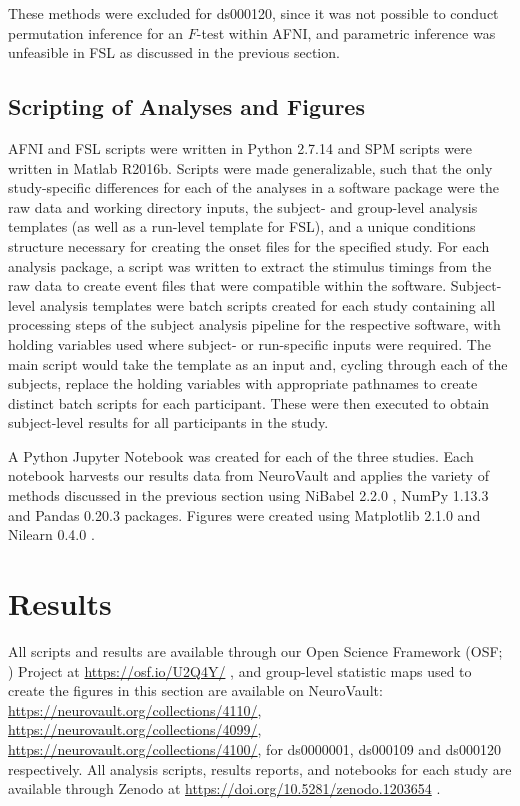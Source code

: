 These methods were excluded for ds000120, since it was not possible to conduct permutation inference for an $F$-test within AFNI, and parametric inference was unfeasible in FSL as discussed in the previous section. 

\subsection{Scripting of Analyses and Figures}
AFNI and FSL scripts were written in Python 2.7.14 and SPM scripts were written in Matlab R2016b. Scripts were made generalizable, such that the only study-specific differences for each of the analyses in a software package were the raw data and working directory inputs, the subject- and group-level analysis templates (as well as a run-level template for FSL), and a unique conditions structure necessary for creating the onset files for the specified study. For each analysis package, a script was written to extract the stimulus timings from the raw data to create event files that were compatible within the software. Subject-level analysis templates were batch scripts created for each study containing all processing steps of the subject analysis pipeline for the respective software, with holding variables used where subject- or run-specific inputs were required. The main script would take the template as an input and, cycling through each of the subjects, replace the holding variables with appropriate pathnames to create distinct batch scripts for each participant. These were then executed to obtain subject-level results for all participants in the study. 

A Python Jupyter Notebook \citep{Kluyver2016-yl} was created for each of the three studies. Each notebook harvests our results data from NeuroVault and applies the variety of methods discussed in the previous section using NiBabel 2.2.0 \citep{Brett2017-zb}, NumPy 1.13.3 \citep{Walt2011-db} and Pandas 0.20.3 \citep{McKinney2010-dv} packages. Figures were created using Matplotlib 2.1.0 \citep{Hunter2007-nu} and Nilearn 0.4.0 \citep{Abraham2014-ap}. 

\section{Results}

All scripts and results are available through our Open Science Framework (OSF; \citep{Erin_D_Foster2017-au}) Project at \href{https://osf.io/U2Q4Y/}{https://osf.io/U2Q4Y/} \citep{Bowring2018-wp}, and group-level statistic maps used to create the figures in this section are available on NeuroVault: \href{https://neurovault.org/collections/4110/}{https://neurovault.org/collections/4110/}, \href{https://neurovault.org/collections/4099/}{https://neurovault.org/collections/4099/}, \href{https://neurovault.org/collections/4100/}{https://neurovault.org/collections/4100/}, for ds0000001, ds000109 and ds000120 respectively. All analysis scripts, results reports, and notebooks for each study are available through Zenodo \citep{Nielsen2014-vl} at \href{https://doi.org/10.5281/zenodo.1203654}{https://doi.org/10.5281/zenodo.1203654} \citep{Bowring2018-jp}.

